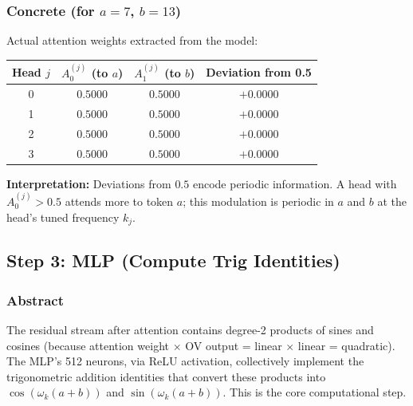 \documentclass[11pt,a4paper]{article}
\begin{document}
\subsubsection*{Concrete (for $a = 7$, $b = 13$)}

Actual attention weights extracted from the model:
\begin{center}
\begin{tabular}{|c|c|c|c|}
\hline
Head $j$ & $A^{(j)}_0$ (to $a$) & $A^{(j)}_1$ (to $b$) & Deviation from 0.5 \\ \hline
  0 & $0.5000$ & $0.5000$ & $+0.0000$ \\ \hline
  1 & $0.5000$ & $0.5000$ & $+0.0000$ \\ \hline
  2 & $0.5000$ & $0.5000$ & $+0.0000$ \\ \hline
  3 & $0.5000$ & $0.5000$ & $+0.0000$ \\ \hline
\end{tabular}
\end{center}

\textbf{Interpretation:} Deviations from $0.5$ encode periodic information. A head with $A^{(j)}_0 > 0.5$ attends more to token $a$; this modulation is periodic in $a$ and $b$ at the head's tuned frequency $k_j$.

\subsection{Step 3: MLP (Compute Trig Identities)}

\subsubsection*{Abstract}
The residual stream after attention contains degree-2 products of sines and cosines (because attention weight $\times$ OV output = linear $\times$ linear = quadratic). The MLP's 512 neurons, via ReLU activation, collectively implement the trigonometric addition identities that convert these products into $\cos(\omega_k(a+b))$ and $\sin(\omega_k(a+b))$. This is the core computational step.
\end{document}
